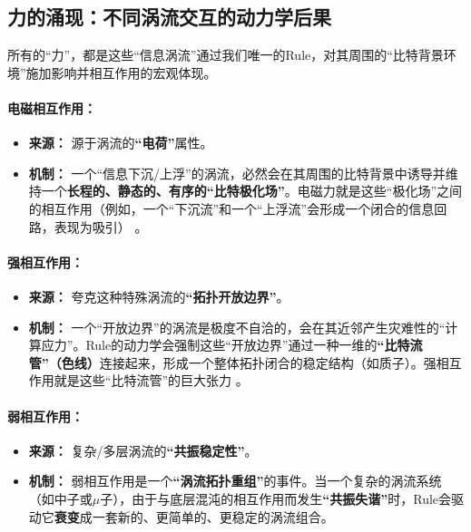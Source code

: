 \documentclass[11pt, a4paper]{article}
\begin{document}
\subsection{力的涌现：不同涡流交互的动力学后果}

所有的“力”，都是这些“信息涡流”通过我们唯一的Rule，对其周围的“比特背景环境”施加影响并相互作用的宏观体现。

\paragraph{电磁相互作用：}
\begin{itemize}
    \item \textbf{来源：} 源于涡流的\textbf{“电荷”}属性。
    \item \textbf{机制：} 一个“信息下沉/上浮”的涡流，必然会在其周围的比特背景中诱导并维持一个\textbf{长程的、静态的、有序的“比特极化场”}。电磁力就是这些“极化场”之间的相互作用（例如，一个“下沉流”和一个“上浮流”会形成一个闭合的信息回路，表现为吸引） \cite{Einstein1905}。
\end{itemize}

\paragraph{强相互作用：}
\begin{itemize}
    \item \textbf{来源：} 夸克这种特殊涡流的\textbf{“拓扑开放边界”}。
    \item \textbf{机制：} 一个“开放边界”的涡流是极度不自洽的，会在其近邻产生灾难性的“计算应力”。Rule的动力学会强制这些“开放边界”通过一种一维的\textbf{“比特流管”（色线）}连接起来，形成一个整体拓扑闭合的稳定结构（如质子）。强相互作用就是这些“比特流管”的巨大张力 \cite{Skyrme1961}。
\end{itemize}

\paragraph{弱相互作用：}
\begin{itemize}
    \item \textbf{来源：} 复杂/多层涡流的\textbf{“共振稳定性”}。
    \item \textbf{机制：} 弱相互作用是一个\textbf{“涡流拓扑重组”}的事件。当一个复杂的涡流系统（如中子或$\mu$子），由于与底层混沌的相互作用而发生\textbf{“共振失谐”}时，Rule会驱动它\textbf{衰变}成一套新的、更简单的、更稳定的涡流组合。
\end{itemize}
\end{document}
